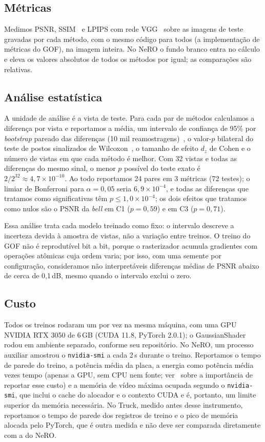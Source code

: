 \documentclass[12pt]{article}
\newcommand{\dB}{\,dB}
\begin{document}
\subsection{Métricas}
Medimos PSNR, SSIM~\cite{wang2004ssim} e LPIPS com rede VGG~\cite{zhang2018lpips} sobre as imagens de teste gravadas por cada método, com o mesmo código para todos (a implementação de métricas do GOF), na imagem inteira.
No NeRO o fundo branco entra no cálculo e eleva os valores absolutos de todos os métodos por igual; as comparações são relativas.

\subsection{Análise estatística}
A unidade de análise é a vista de teste.
Para cada par de métodos calculamos a diferença por vista e reportamos a média, um intervalo de confiança de 95\% por \emph{bootstrap} pareado das diferenças (10 mil reamostragens)~\cite{efron1979bootstrap}, o valor-$p$ bilateral do teste de postos sinalizados de Wilcoxon~\cite{wilcoxon1945}, o tamanho de efeito $d_z$ de Cohen e o número de vistas em que cada método é melhor.
Com 32 vistas e todas as diferenças do mesmo sinal, o menor $p$ possível do teste exato é $2/2^{32}\approx4{,}7\times10^{-10}$.
Ao todo reportamos 24 pares em 3 métricas (72 testes); o limiar de Bonferroni para $\alpha=0{,}05$ seria $6{,}9\times10^{-4}$, e todas as diferenças que tratamos como significativas têm $p\leq1{,}0\times10^{-4}$; os dois efeitos que tratamos como nulos são o PSNR da \emph{bell} em C1 ($p=0{,}59$) e em C3 ($p=0{,}71$).

Essa análise trata cada modelo treinado como fixo: o intervalo descreve a incerteza devida à amostra de vistas, não a variação entre treinos.
O treino do GOF não é reprodutível bit a bit, porque o rasterizador acumula gradientes com operações atômicas cuja ordem varia; por isso, com uma semente por configuração, consideramos não interpretáveis diferenças médias de PSNR abaixo de cerca de 0,1\dB, mesmo quando o intervalo exclui o zero.

\subsection{Custo}
Todos os treinos rodaram um por vez na mesma máquina, com uma GPU NVIDIA RTX 3050 de 6\,GB (CUDA 11.8, PyTorch 2.0.1); o GaussianShader rodou em ambiente separado, conforme seu repositório.
No NeRO, um processo auxiliar amostrou o \texttt{nvidia-smi} a cada 2\,s durante o treino.
Reportamos o tempo de parede do treino, a potência média da placa, a energia como potência média vezes tempo (apenas a GPU, sem CPU nem fonte; ver~\cite{strubell2019energy} sobre a importância de reportar esse custo) e a memória de vídeo máxima ocupada segundo o \texttt{nvidia-smi}, que inclui o cache do alocador e o contexto CUDA e é, portanto, um limite superior da memória necessária.
No Truck, medido antes desse instrumento, reportamos o tempo de parede dos registros de treino e o pico de memória alocada pelo PyTorch, que é outra medida e não deve ser comparada diretamente com a do NeRO.
\end{document}
